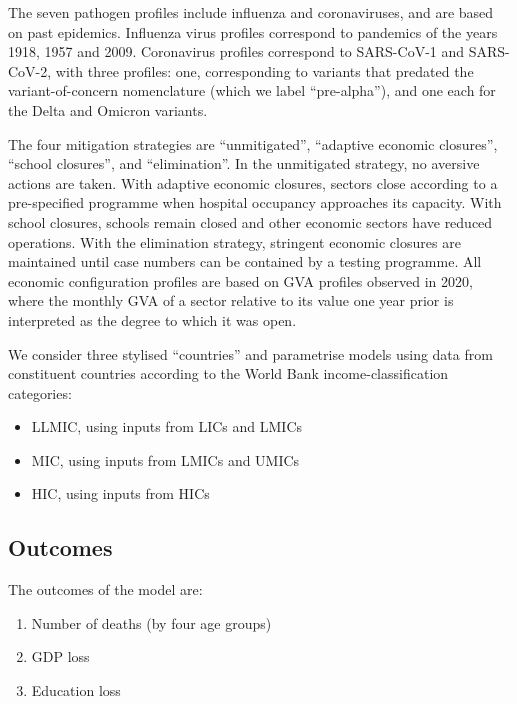\documentclass[
]{article}
\providecommand{\tightlist}{%
  \setlength{\itemsep}{0pt}\setlength{\parskip}{0pt}}
\begin{document}
The seven pathogen profiles include influenza and coronaviruses, and are based on past epidemics. Influenza virus profiles correspond to pandemics of the years 1918, 1957 and 2009. Coronavirus profiles correspond to SARS-CoV-1 and SARS-CoV-2, with three profiles: one, corresponding to variants that predated the variant-of-concern nomenclature (which we label ``pre-alpha''), and one each for the Delta and Omicron variants.

The four mitigation strategies are ``unmitigated'', ``adaptive economic closures'', ``school closures'', and ``elimination''. In the unmitigated strategy, no aversive actions are taken. With adaptive economic closures, sectors close according to a pre-specified programme when hospital occupancy approaches its capacity. With school closures, schools remain closed and other economic sectors have reduced operations. With the elimination strategy, stringent economic closures are maintained until case numbers can be contained by a testing programme. All economic configuration profiles are based on GVA profiles observed in 2020, where the monthly GVA of a sector relative to its value one year prior is interpreted as the degree to which it was open.

We consider three stylised ``countries'' and parametrise models using data from constituent countries according to the World Bank income-classification categories:

\begin{itemize}
\tightlist
\item
  LLMIC, using inputs from LICs and LMICs
\item
  MIC, using inputs from LMICs and UMICs
\item
  HIC, using inputs from HICs
\end{itemize}

\hypertarget{outcomes}{%
\subsection{Outcomes}\label{outcomes}}

The outcomes of the model are:

\begin{enumerate}
\def\labelenumi{\arabic{enumi}.}
\tightlist
\item
  Number of deaths (by four age groups)
\item
  GDP loss
\item
  Education loss
\end{enumerate}
\end{document}
